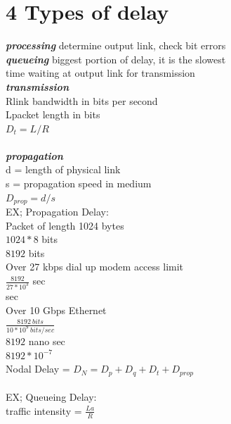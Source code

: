 \section*{4 Types of delay}

\noindent\large{\bf \textit{processing}} \arr determine output link, check bit errors\\

\noindent\large{\bf \textit{queueing}} \arr biggest portion of delay, it is the slowest\\
\indent\indent\indent\indent\arr time waiting at output link for transmission\\

\noindent\large{\bf \textit{transmission}}\\
R\arr link bandwidth in bits per second\\
L\arr packet length in bits\\
$D_t = L/R$ \\
 \\

\noindent\large{\bf \textit{propagation}}\\
d = length of physical link\\
s = propagation speed in medium\\
$D_{prop} = d/s$\\

\indent\indent\indent\indent\indent EX; Propagation Delay:\\
\indent\indent\indent\indent\indent Packet of length 1024 bytes\\
\indent\indent\indent\indent\indent        \arr $1024 * 8$ bits\\
\indent\indent\indent\indent\indent        \arr $8192$ bits\\

\indent\indent\indent\indent\indent Over 27 kbps dial up modem access limit\\
\indent\indent\indent\indent\indent        \arr $\frac{8192}{27*10^3}$ sec  \\
\indent\indent\indent\indent\indent        {} sec\\
\indent\indent\indent\indent\indent Over 10 Gbps Ethernet\\
\indent\indent\indent\indent\indent        \arr $\frac{8192 ~bits}{10*10^9 ~bits/sec}$ \\
\indent\indent\indent\indent\indent        \arr $8192$ nano sec\\
\indent\indent\indent\indent\indent        \arr $8192 * 10^{-7}$\\


\noindent Nodal Delay = $D_N = D_p + D_q + D_t + D_{prop}$
 \\
 \\
\noindent EX; Queueing Delay:\\
traffic intensity = $\frac{La}{R}$\\
